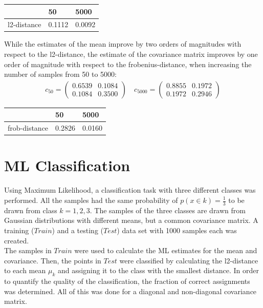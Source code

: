 \documentclass[DIV=12, ngerman, fontsize=12pt, parskip=half]{scrreprt}
\begin{document}
	\begin{table}[H]
	\begin{center}	
		\begin{tabular}{|l|l|l|}
			\hline
			& 50 & 5000 \\
			\hline
			l2-distance & 0.1112   & 0.0092   \\
			\hline
		\end{tabular}
	\end{center}
	\end{table}

	While the estimates of the mean improve by two orders of magnitudes with respect to the l2-distance, the estimate of the covariance matrix improves by one order of magnitude with respect to the frobenius-distance, when increasing the number of samples from 50 to 5000:
	\begin{align*}
		c_{50} = \begin{pmatrix}			
					0.6539 & 0.1084\\
					0.1084 & 0.3500
				 \end{pmatrix}
		\quad 
		c_{5000} = \begin{pmatrix}			
					0.8855 & 0.1972\\
					0.1972 & 0.2946
					\end{pmatrix}
	\end{align*} 

	\begin{table}[H]
	\begin{center}	
		\begin{tabular}{|l|l|l|}
			\hline
			& 50 & 5000 \\
			\hline
			frob-distance & 0.2826   & 0.0160   \\
			\hline
		\end{tabular}
	\end{center}
	\end{table}
	
	
	\section{ML Classification}
	Using Maximum Likelihood, a classification task with three different classes was performed. All the samples had the same probability of $p(x \in k) = \frac{1}{3}$ to be drawn from class $k = 1,2,3$. The samples of the three classes are drawn from Gaussian distributions with different means, but a common covariance matrix. A training ($Train$) and a testing ($Test$) data set with 1000 samples each was created. \\
	 The samples in $Train$ were used to calculate the ML estimates for the mean and covariance. Then, the points in $Test$ were classified by calculating the l2-distance to each mean $\mu_k$ and assigning it to the class with the smallest distance. In order to quantify the quality of the classification, the fraction of correct assignments was determined. All of this was done for a diagonal and non-diagonal covariance matrix.
	
\end{document}
